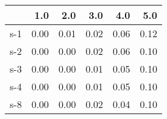 \begin{tabular}{lrrrrr}
\toprule
{} &  1.0 &  2.0 &  3.0 &  4.0 &  5.0 \\
\midrule
s-1 & 0.00 & 0.01 & 0.02 & 0.06 & 0.12 \\
s-2 & 0.00 & 0.00 & 0.02 & 0.06 & 0.10 \\
s-3 & 0.00 & 0.00 & 0.01 & 0.05 & 0.10 \\
s-4 & 0.00 & 0.00 & 0.01 & 0.05 & 0.10 \\
s-8 & 0.00 & 0.00 & 0.02 & 0.04 & 0.10 \\
\bottomrule
\end{tabular}
